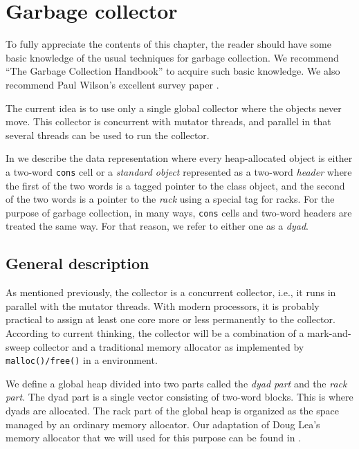 \chapter{Garbage collector}

To fully appreciate the contents of this chapter, the reader should
have some basic knowledge of the usual techniques for garbage
collection.  We recommend ``The Garbage Collection Handbook''
\cite{Jones:2011:GCH:2025255} to acquire such basic knowledge.  We
also recommend Paul Wilson's excellent survey paper
\cite{Wilson:1992:UGC:645648.664824}.

The current idea is to use only a single global collector where the
objects never move.  This collector is concurrent with mutator
threads, and parallel in that several threads can be used to run the
collector.

In  we describe the data
representation where every heap-allocated object is either a two-word
\texttt{cons} cell or a \emph{standard object} represented as a
two-word \emph{header} where the first of the two words is a tagged
pointer to the class object, and the second of the two words is a
pointer to the \emph{rack} using a special tag for racks.  For the
purpose of garbage collection, in many ways, \texttt{cons} cells and
two-word headers are treated the same way.  For that reason, we refer
to either one as a \emph{dyad}.

\section{General description}

As mentioned previously, the collector is a concurrent collector,
i.e., it runs in parallel with the mutator threads.  With modern
processors, it is probably practical to assign at least one core more
or less permanently to the collector.  According to current
thinking, the collector will be a combination of a
mark-and-sweep collector and a traditional memory allocator as
implemented by \texttt{malloc()/free()} in a \clanguage{} environment.

We define a global heap divided into two parts called the \emph{dyad
  part} and the \emph{rack part}.  The dyad part is a single vector
consisting of two-word blocks.  This is where dyads are allocated.
The rack part of the global heap is organized as the space managed by
an ordinary memory allocator.  Our adaptation of Doug Lea's memory
allocator that we will used for this purpose can be found in
.

